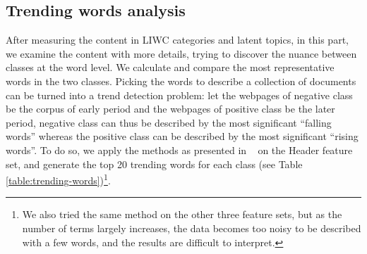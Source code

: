 \documentclass[phd,tocprelim]{cornell}
\begin{document}
\subsection{Trending words analysis}
After measuring the content in LIWC categories and latent topics, in this part, we examine the content with more details, trying to discover the nuance between classes at the word level. We calculate and compare the most representative words in the two classes. Picking the words to describe a collection of documents can be turned into a trend detection problem: let the webpages of negative class be the corpus of early period and the webpages of positive class be the later period, negative class can thus be described by the most significant ``falling words'' whereas the positive class can be described by the most significant ``rising words''.  To do so, we apply the methods as presented in ~\cite{Kleinberg:2004} on the Header feature set, and generate the top 20 trending words for each class (see Table \ref{table:trending-words})\footnote{We also tried the same method on the other three feature sets, but as the number of terms largely increases, the data becomes too noisy to be described with a few words, and the results are difficult to interpret.}. 
\end{document}
